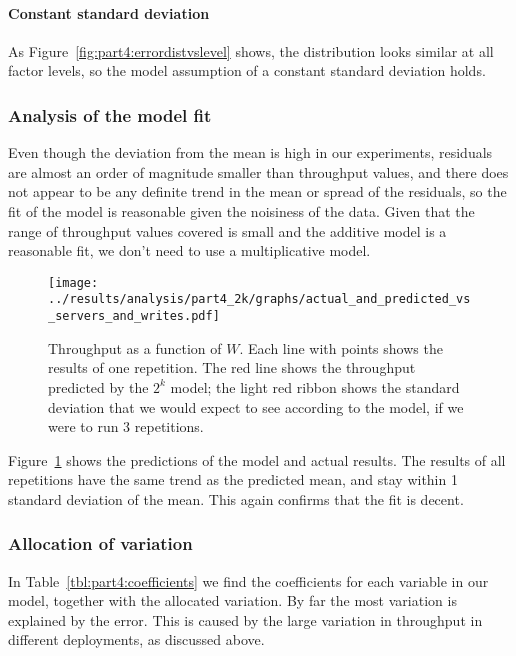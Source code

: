 \documentclass[11pt]{article}
\begin{document}
\paragraph{Constant standard deviation} As Figure~\ref{fig:part4:errordistvslevel} shows, the distribution looks similar at all factor levels, so the model assumption of a constant standard deviation holds.


\subsubsection{Analysis of the model fit}

Even though the deviation from the mean is high in our experiments, residuals are almost an order of magnitude smaller than throughput values, and there does not appear to be any definite trend in the mean or spread of the residuals, so the fit of the model is reasonable given the noisiness of the data. Given that the range of throughput values covered is small and the additive model is a reasonable fit, we don't need to use a multiplicative model.

\begin{figure}[h]
\centering
\texttt{[image: ../results/analysis/part4\_2k/graphs/actual\_and\_predicted\_vs\_servers\_and\_writes.pdf]}
\caption{Throughput as a function of $W$. Each line with points shows the results of one repetition. The red line shows the throughput predicted by the $2^k$ model; the light red ribbon shows the standard deviation that we would expect to see according to the model, if we were to run 3 repetitions.}
\label{fig:part4:actual_and_predicted_vs_servers_and_writes}
\end{figure}

Figure~\ref{fig:part4:actual_and_predicted_vs_servers_and_writes} shows the predictions of the model and actual results. The results of all repetitions have the same trend as the predicted mean, and stay within 1 standard deviation of the mean. This again confirms that the fit is decent.

\subsubsection{Allocation of variation}



In Table~\ref{tbl:part4:coefficients} we find the coefficients for each variable in our model, together with the allocated variation. By far the most variation is explained by the error. This is caused by the large variation in throughput in different deployments, as discussed above.
\end{document}
